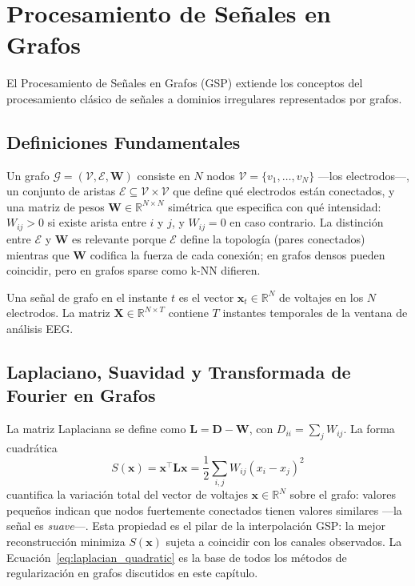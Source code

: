 \section{Procesamiento de Señales en Grafos}

El Procesamiento de Señales en Grafos (GSP) \cite{shuman2013,ortega2018} extiende los conceptos del procesamiento clásico de señales a dominios irregulares representados por grafos.

\subsection{Definiciones Fundamentales}

Un grafo $\mathcal{G} = (\mathcal{V}, \mathcal{E}, \mathbf{W})$ consiste en $N$ nodos $\mathcal{V} = \{v_1, \dots, v_N\}$ ---los electrodos---, un conjunto de aristas $\mathcal{E} \subseteq \mathcal{V} \times \mathcal{V}$ que define qué electrodos están conectados, y una matriz de pesos $\mathbf{W} \in \mathbb{R}^{N \times N}$ simétrica que especifica con qué intensidad: $W_{ij} > 0$ si existe arista entre $i$ y $j$, y $W_{ij} = 0$ en caso contrario. La distinción entre $\mathcal{E}$ y $\mathbf{W}$ es relevante porque $\mathcal{E}$ define la topología (pares conectados) mientras que $\mathbf{W}$ codifica la fuerza de cada conexión; en grafos densos pueden coincidir, pero en grafos sparse como k-NN difieren.

Una señal de grafo en el instante $t$ es el vector $\mathbf{x}_t \in \mathbb{R}^N$ de voltajes en los $N$ electrodos. La matriz $\mathbf{X} \in \mathbb{R}^{N \times T}$ contiene $T$ instantes temporales de la ventana de análisis EEG.

\subsection{Laplaciano, Suavidad y Transformada de Fourier en Grafos}

La matriz Laplaciana se define como $\mathbf{L} = \mathbf{D} - \mathbf{W}$, con $D_{ii} = \sum_j W_{ij}$. La forma cuadrática
\begin{equation}
S(\mathbf{x}) = \mathbf{x}^\top \mathbf{L} \mathbf{x} = \frac{1}{2} \sum_{i,j} W_{ij} (x_i - x_j)^2
\label{eq:laplacian_quadratic}
\end{equation}
cuantifica la variación total del vector de voltajes $\mathbf{x} \in \mathbb{R}^N$ sobre el grafo: valores pequeños indican que nodos fuertemente conectados tienen valores similares ---la señal es \textit{suave}---. Esta propiedad es el pilar de la interpolación GSP: la mejor reconstrucción minimiza $S(\mathbf{x})$ sujeta a coincidir con los canales observados. La Ecuación~\ref{eq:laplacian_quadratic} es la base de todos los métodos de regularización en grafos discutidos en este capítulo.

